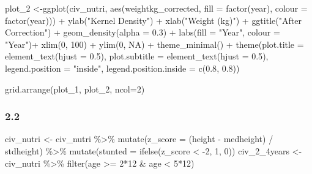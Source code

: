 \documentclass[
  letterpaper,
  DIV=11,
  numbers=noendperiod]{scrartcl}
\newenvironment{Shaded}{\begin{snugshade}}{\end{snugshade}}
\newcommand{\AttributeTok}[1]{\textcolor[rgb]{0.40,0.45,0.13}{#1}}
\newcommand{\ConstantTok}[1]{\textcolor[rgb]{0.56,0.35,0.01}{#1}}
\newcommand{\DecValTok}[1]{\textcolor[rgb]{0.68,0.00,0.00}{#1}}
\newcommand{\FloatTok}[1]{\textcolor[rgb]{0.68,0.00,0.00}{#1}}
\newcommand{\FunctionTok}[1]{\textcolor[rgb]{0.28,0.35,0.67}{#1}}
\newcommand{\NormalTok}[1]{\textcolor[rgb]{0.00,0.23,0.31}{#1}}
\newcommand{\OtherTok}[1]{\textcolor[rgb]{0.00,0.23,0.31}{#1}}
\newcommand{\SpecialCharTok}[1]{\textcolor[rgb]{0.37,0.37,0.37}{#1}}
\newcommand{\StringTok}[1]{\textcolor[rgb]{0.13,0.47,0.30}{#1}}
\begin{document}
\begin{Shaded}
\begin{Highlighting}[]
\NormalTok{plot\_2 }\OtherTok{\textless{}{-}}\FunctionTok{ggplot}\NormalTok{(civ\_nutri, }\FunctionTok{aes}\NormalTok{(weightkg\_corrected, }\AttributeTok{fill =} \FunctionTok{factor}\NormalTok{(year), }\AttributeTok{colour =} \FunctionTok{factor}\NormalTok{(year))) }\SpecialCharTok{+} \FunctionTok{ylab}\NormalTok{(}\StringTok{"Kernel Density"}\NormalTok{) }\SpecialCharTok{+} \FunctionTok{xlab}\NormalTok{(}\StringTok{"Weight (kg)"}\NormalTok{) }\SpecialCharTok{+} \FunctionTok{ggtitle}\NormalTok{(}\StringTok{"After Correction"}\NormalTok{) }\SpecialCharTok{+}
  \FunctionTok{geom\_density}\NormalTok{(}\AttributeTok{alpha =} \FloatTok{0.3}\NormalTok{) }\SpecialCharTok{+}
  \FunctionTok{labs}\NormalTok{(}\AttributeTok{fill =} \StringTok{"Year"}\NormalTok{, }\AttributeTok{colour =} \StringTok{"Year"}\NormalTok{)}\SpecialCharTok{+}
  \FunctionTok{xlim}\NormalTok{(}\DecValTok{0}\NormalTok{, }\DecValTok{100}\NormalTok{) }\SpecialCharTok{+} \FunctionTok{ylim}\NormalTok{(}\DecValTok{0}\NormalTok{, }\ConstantTok{NA}\NormalTok{) }\SpecialCharTok{+} \FunctionTok{theme\_minimal}\NormalTok{() }\SpecialCharTok{+}
  \FunctionTok{theme}\NormalTok{(}\AttributeTok{plot.title =} \FunctionTok{element\_text}\NormalTok{(}\AttributeTok{hjust =} \FloatTok{0.5}\NormalTok{), }\AttributeTok{plot.subtitle =} \FunctionTok{element\_text}\NormalTok{(}\AttributeTok{hjust =} \FloatTok{0.5}\NormalTok{), }\AttributeTok{legend.position =} \StringTok{"inside"}\NormalTok{, }\AttributeTok{legend.position.inside =} \FunctionTok{c}\NormalTok{(}\FloatTok{0.8}\NormalTok{, }\FloatTok{0.8}\NormalTok{))}

\FunctionTok{grid.arrange}\NormalTok{(plot\_1, plot\_2, }\AttributeTok{ncol=}\DecValTok{2}\NormalTok{)}
\end{Highlighting}
\end{Shaded}

\subsubsection{2.2}\label{section}

\begin{Shaded}
\begin{Highlighting}[]
\NormalTok{civ\_nutri }\OtherTok{\textless{}{-}}\NormalTok{ civ\_nutri }\SpecialCharTok{\%\textgreater{}\%} \FunctionTok{mutate}\NormalTok{(}\AttributeTok{z\_score =}\NormalTok{ (height }\SpecialCharTok{{-}}\NormalTok{ medheight) }\SpecialCharTok{/}\NormalTok{ stdheight) }\SpecialCharTok{\%\textgreater{}\%} \FunctionTok{mutate}\NormalTok{(}\AttributeTok{stunted =} \FunctionTok{ifelse}\NormalTok{(z\_score }\SpecialCharTok{\textless{}} \SpecialCharTok{{-}}\DecValTok{2}\NormalTok{, }\DecValTok{1}\NormalTok{, }\DecValTok{0}\NormalTok{))}
\NormalTok{civ\_2\_4years }\OtherTok{\textless{}{-}}\NormalTok{ civ\_nutri }\SpecialCharTok{\%\textgreater{}\%} \FunctionTok{filter}\NormalTok{(age }\SpecialCharTok{\textgreater{}=} \DecValTok{2}\SpecialCharTok{*}\DecValTok{12} \SpecialCharTok{\&}\NormalTok{ age }\SpecialCharTok{\textless{}} \DecValTok{5}\SpecialCharTok{*}\DecValTok{12}\NormalTok{)}
\end{Highlighting}
\end{Shaded}
\end{document}
